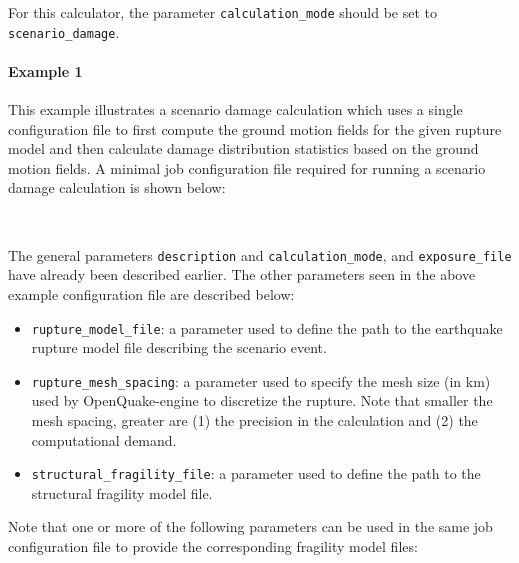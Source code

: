For this calculator, the parameter \Verb+calculation_mode+ should be set to
\Verb+scenario_damage+.

\paragraph{Example 1}

This example illustrates a scenario damage calculation which uses a single
configuration file to first compute the ground motion fields for the given
rupture model and then calculate damage distribution statistics based on the
ground motion fields. A minimal job configuration file required for
running a scenario damage calculation is shown below:

\inputminted[firstline=1,firstnumber=1,fontsize=\footnotesize,frame=single,linenos,bgcolor=lightgray]{ini}{oqum/risk/Verbatim/config_scenario_damage_combined.ini}\\

The general parameters \Verb+description+ and \Verb+calculation_mode+, and
\Verb+exposure_file+ have already been described earlier. The other parameters
seen in the above example configuration file are described below:

\begin{itemize}

  \item \Verb+rupture_model_file+: a parameter used to define the path
	to the earthquake \gls{rupture model} file describing the scenario event.

  \item \Verb+rupture_mesh_spacing+: a parameter used to specify the mesh size
  	(in km) used by OpenQuake-engine to discretize the rupture.
  	Note that smaller the mesh spacing, greater are
  	(1) the precision in the calculation and
  	(2) the computational demand.

  \item \Verb+structural_fragility_file+: a parameter used to define the path
	to the structural \gls{fragility model} file.

\end{itemize}

Note that one or more of the following parameters can be used in the same job
configuration file to provide the corresponding fragility model files:

